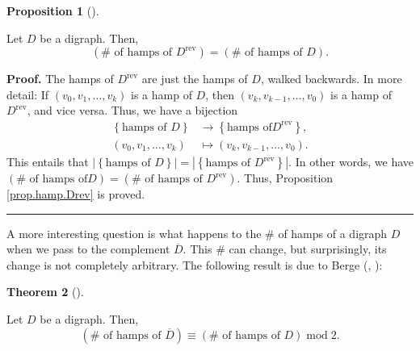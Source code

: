 \documentclass[numbers=enddot,12pt,final,onecolumn,notitlepage]{scrartcl}%
\numberwithin{exer}{subsection}
\theoremstyle{definition}
\newtheorem{theo}{Theorem}[subsection]
\newenvironment{theorem}[1][]
{\begin{theo}[#1]\begin{leftbar}}
{\end{leftbar}\end{theo}}
\newtheorem{prop}[theo]{Proposition}
\newenvironment{proposition}[1][]
{\begin{prop}[#1]\begin{leftbar}}
{\end{leftbar}\end{prop}}
\newenvironment{proof}[1][Proof]{\noindent\textbf{#1.} }{\ \rule{0.5em}{0.5em}}
\begin{document}
\begin{proposition}
\label{prop.hamp.Drev}Let $D$ be a digraph. Then,%
\[
\left(  \#\text{ of hamps of }D^{\operatorname*{rev}}\right)  =\left(
\#\text{ of hamps of }D\right)  .
\]

\end{proposition}

\begin{proof}
The hamps of $D^{\operatorname*{rev}}$ are just the hamps of $D$, walked
backwards. In more detail: If $\left(  v_{0},v_{1},\ldots,v_{k}\right)  $ is a
hamp of $D$, then $\left(  v_{k},v_{k-1},\ldots,v_{0}\right)  $ is a hamp of
$D^{\operatorname*{rev}}$, and vice versa. Thus, we have a bijection%
\begin{align*}
\left\{  \text{hamps of }D\right\}   &  \rightarrow\left\{  \text{hamps of
}D^{\operatorname*{rev}}\right\}  ,\\
\left(  v_{0},v_{1},\ldots,v_{k}\right)   &  \mapsto\left(  v_{k}%
,v_{k-1},\ldots,v_{0}\right)  .
\end{align*}
This entails that $\left\vert \left\{  \text{hamps of }D\right\}  \right\vert
=\left\vert \left\{  \text{hamps of }D^{\operatorname*{rev}}\right\}
\right\vert $. In other words, we have $\left(  \#\text{ of hamps of
}D\right)  =\left(  \#\text{ of hamps of }D^{\operatorname*{rev}}\right)  $.
Thus, Proposition \ref{prop.hamp.Drev} is proved.
\end{proof}

A more interesting question is what happens to the $\#$ of hamps of a digraph
$D$ when we pass to the complement $\overline{D}$. This $\#$ can change, but
surprisingly, its change is not completely arbitrary. The following result is
due to Berge (\cite[\S 10.1, Theorem 1]{Berge91}, \cite[Problem 7.7, directed
case]{Tomesc85}):

\begin{theorem}
[Berge]\label{thm.hamp.Dbar}Let $D$ be a digraph. Then,%
\[
\left(  \#\text{ of hamps of }\overline{D}\right)  \equiv\left(  \#\text{ of
hamps of }D\right)  \operatorname{mod}2.
\]

\end{theorem}
\end{document}
